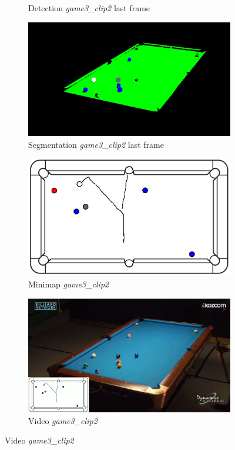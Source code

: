 \begin{figure}[H]
\begin{subfigure}[b]{0.48\textwidth}
		\caption{Detection \textit{game3\_clip2} last frame}
		\label{fig: game3_clip2_last_frame_detected}
	\end{subfigure}
	\begin{subfigure}[b]{0.48\textwidth}
		\centering
		\includegraphics[width=\textwidth]{images/Segmentation/game3_clip2_segmented_balls_last_frame.jpg}
		\caption{Segmentation \textit{game3\_clip2} last frame}
		\label{fig: game3_clip2_last_frame_segmented}
	\end{subfigure}
	\begin{subfigure}[b]{0.48\textwidth}
		\centering
		\includegraphics[width=\textwidth]{images/AllMinimap/game3_clip2_minimap.png}
		\caption{Minimap \textit{game3\_clip2}}
		\label{fig: game3_clip2_minimap}
	\end{subfigure}
	\begin{subfigure}[b]{0.48\textwidth}
		\centering
		\includegraphics[width=\textwidth]{images/Video/game3_clip2_video.jpg}
		\caption{Video \textit{game3\_clip2}}
		\label{fig: game3_clip2_video}
	\end{subfigure}


\end{figure}
